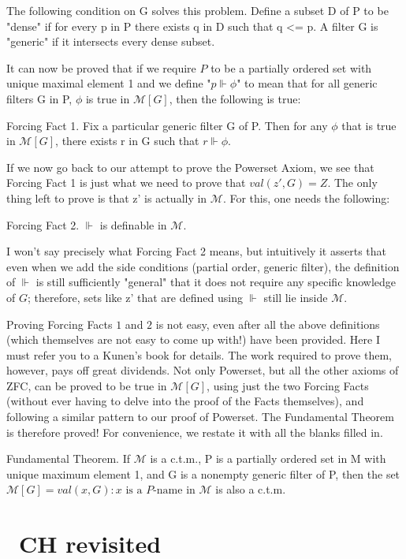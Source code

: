 \documentclass[10pt]{article}
\theoremstyle{definition}
\begin{document}
The following condition on G solves this problem.  Define a subset D of P
to be "dense" if for every p in P there exists q in D such that q <= p.
A filter G is "generic" if it intersects every dense subset.

It can now be proved that if we require $P$ to be a partially ordered set with
unique maximal element 1 and we define "$p \Vdash \phi$" to mean that for all
generic filters G in P, $\phi$ is true in $\mathcal{M}[G]$, then the following is true:

Forcing Fact 1.  Fix a particular generic filter G of P.  Then for any $\phi$
that is true in $\mathcal{M}[G]$, there exists r in G such that $r \Vdash \phi$.

If we now go back to our attempt to prove the Powerset Axiom, we see that
Forcing Fact 1 is just what we need to prove that $val(z',G) = Z$.  The only
thing left to prove is that z' is actually in $\mathcal M$.  For this, one needs the
following:

Forcing Fact 2.  $\Vdash$ is definable in $\mathcal M$.

I won't say precisely what Forcing Fact 2 means, but intuitively it asserts
that even when we add the side conditions (partial order, generic filter),
the definition of $\Vdash$ is still sufficiently "general" that it does not
require any specific knowledge of $G$; therefore, sets like z' that are
defined using $\Vdash$ still lie inside $\mathcal{M}$.

Proving Forcing Facts $1$ and $2$ is not easy, even after all the above
definitions (which themselves are not easy to come up with!) have been
provided.  Here I must refer you to a Kunen's book for details.  The work
required to prove them, however, pays off great dividends.  Not only
Powerset, but all the other axioms of ZFC, can be proved to be true in $\mathcal{M}[G]$,
using just the two Forcing Facts (without ever having to delve into the
proof of the Facts themselves), and following a similar pattern to our proof
of Powerset.  The Fundamental Theorem is therefore proved!  For convenience,
we restate it with all the blanks filled in.

Fundamental Theorem.  If $\mathcal{M}$ is a c.t.m., P is a partially ordered set in M
with unique maximum element 1, and G is a nonempty generic filter of P, then
the set $\mathcal{M}[G] = {val(x,G) : x \text{ is a }P\text{-name in }\mathcal M}$ is also a c.t.m.


\section{~CH revisited}
\end{document}
